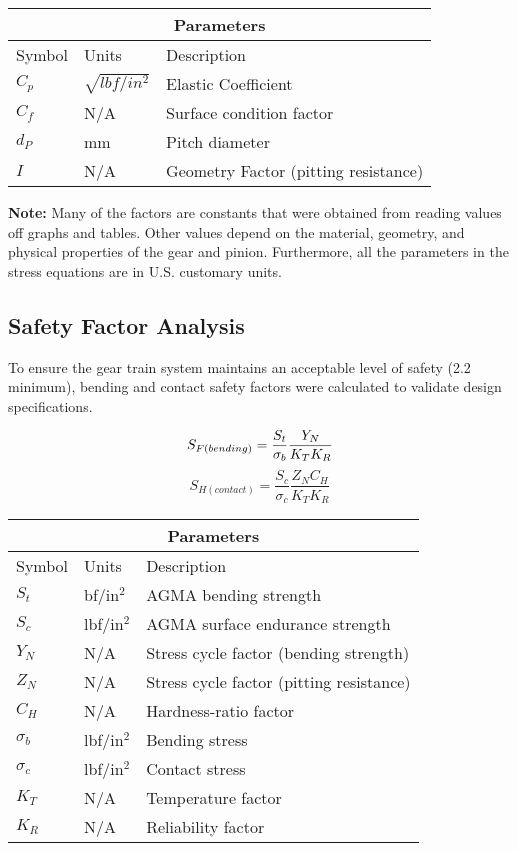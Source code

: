 \documentclass[letterpaper,12pt]{article}
\begin{document}
\begin{center}
	\begin{tabular}{ |p{2cm}||p{2cm}|p{7cm}|  }
		\hline
		\multicolumn{3}{|c|}{Parameters} \\
		\hline
		Symbol & Units & Description\\
		\hline
		$C_p$ & $\sqrt{lbf/in^2}$ & Elastic Coefficient\\
		$C_f$ & N/A & Surface condition factor\\
		$d_P$ & mm & Pitch diameter\\
		$I$ & N/A & Geometry Factor (pitting resistance)\\
		\hline
	\end{tabular}
\end{center}

\noindent\textbf{Note:} Many of the factors are constants that were obtained from reading values off graphs and tables. Other values depend on the material, geometry, and physical properties of the gear and pinion. Furthermore, all the parameters in the stress equations are in U.S. customary units.

\subsection{Safety Factor Analysis}
To ensure the gear train system maintains an acceptable level of safety (2.2 minimum), bending and contact safety factors were calculated to validate design specifications.

\begin{equation}
S_{F(bending)} = \frac{S_t}{\sigma_b}\frac{Y_N}{K_T K_R} \\
\end{equation}
\begin{equation}
S_{H(contact)} = \frac{S_c}{\sigma_c}\frac{Z_N C_H}{K_T K_R}
\end{equation}

\begin{center}
	\begin{tabular}{ |p{2cm}||p{2cm}|p{7cm}|  }
		\hline
		\multicolumn{3}{|c|}{Parameters} \\
		\hline
		Symbol & Units & Description\\
		\hline
		$S_t$ & bf/in$^2$ & AGMA bending strength\\
		$S_c$ & lbf/in$^2$ & AGMA surface endurance strength\\
		$Y_N$ & N/A & Stress cycle factor (bending strength)\\
		$Z_N$ & N/A & Stress cycle factor (pitting resistance)\\
		$C_H$ & N/A & Hardness-ratio factor\\
		$\sigma_b$ & lbf/in$^2$ & Bending stress\\
		$\sigma_c$ & lbf/in$^2$ & Contact stress\\
		$K_T$ & N/A & Temperature factor\\
		$K_R$ & N/A & Reliability factor\\
		\hline
	\end{tabular}
\end{center}
\end{document}
